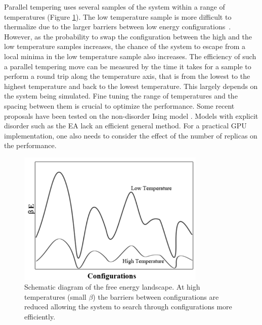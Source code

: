 Parallel tempering uses several samples of the system within a range of 
temperatures (Figure \ref{fig-pt}). The low temperature sample is more difficult 
to thermalize due to the larger barriers between low energy 
configurations~\cite{Marinari-Parisi1992,Hukushima-Nemoto1996}.
However, as the probability to swap the configuration between the high and the low temperature samples 
increases, the chance of the system to escape from a local minima in the low temperature sample also 
increases. The efficiency of such a parallel 
tempering move can be measured by the time it takes for a sample to perform a 
round trip along the temperature axis, that is from the lowest to the highest 
temperature and back to the lowest temperature. This largely depends on 
the system being simulated. Fine tuning the range of temperatures and the 
spacing between them is crucial to optimize the performance. Some 
recent proposals have been tested on the non-disorder Ising model \cite{PhysRevLett.101.130603,1742-5468-2006-03-P03018,jcp/124/17/10.1063/1.2186639}.
Models with explicit disorder such as the EA lack an efficient 
general method. For a practical GPU implementation, one also 
needs to consider the effect of the number of replicas on the performance.


\begin{figure}[ht]
  \centering
  \includegraphics[width=0.8\textwidth] {img/barrier.pdf}
  \caption{Schematic diagram of the free energy landscape.  At high temperatures 
(small $\beta$) the barriers between configurations are reduced allowing the 
system to search through configurations more efficiently.}
\label{fig-pt}
\end{figure}







